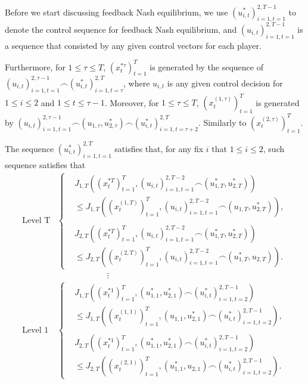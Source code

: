 \documentclass[letterpaper, 10 pt, conference]{ieeeconf}  %
\begin{document}
Before we start discussing feedback Nash equilibrium, we use $(u_{i,t}^{*})_{i=1,t=1}^{2,T-1}$ to denote the control sequence for feedback Nash equilibrium, and $(u_{i,t})_{i=1,t=1}^{2,T-1}$ is a sequence that consisted by any given control vectors for each player. 

Furthermore, for $1 \leq \tau \leq T$, $(x_{t}^{*\tau})_{t=1}^{T}$ is generated by the sequence of $(u_{i,t})_{i=1,t=1}^{2,\tau-1} \frown (u_{i,t}^{*})_{i=1,t=\tau}^{2,T}$, where $u_{i,t}$ is any given control decision for $1 \leq i \leq 2$ and $1 \leq t \leq \tau-1$. Moreover, for $1 \leq \tau \leq T$, $(x_{t}^{(1,\tau)})_{t=1}^{T}$ is generated by $(u_{i,t})_{i=1,t=1}^{2,\tau-1} \frown (u_{1,\tau},u_{2,\tau}^{*}) \frown (u_{i,t}^{*})_{i=1,t=\tau+2}^{2,T}$. Similarly to $(x_{t}^{(2,\tau)})_{t=1}^{T}$.

The sequence $( u_{i,t}^{*})_{i=1,t=1}^{2,T}$ satisfies that, for any fix $i$ that $1 \leq i \leq 2$, such 
sequence satisfies that 
\begin{equation}\label{eq:nashIneq}
    \begin{split}
        \text{Level T}
        &\begin{cases}
            &J_{1,T}((x_{t}^{*T})_{t=1}^{T}, (u_{i,t})_{i=1,t=1}^{2,T-2} \frown (u_{1,T}^{*},u_{2,T}^{*})) \\ & \leq J_{1,T}((x_{t}^{(1,T)})_{t=1}^{T}, (u_{i,t})_{i=1,t=1}^{2,T-2} \frown (u_{1,T},u_{2,T}^{*})),\\ \\
            &J_{2,T}((x_{t}^{*T})_{t=1}^{T}, (u_{i,t})_{i=1,t=1}^{2,T-2} \frown (u_{1,T}^{*},u_{2,T}^{*})) \\ & \leq J_{2,T}((x_{t}^{(2,T)})_{t=1}^{T}, (u_{i,t})_{i=1,t=1}^{2,T-2} \frown (u_{1,T}^{*},u_{2,T})).
        \end{cases}
    \\ &\qquad \qquad \qquad \vdots \\
    \text{Level 1}
        &\begin{cases}
            &J_{1,T}((x_{t}^{*1})_{t=1}^{T}, (u_{1,1}^{*},u_{2,1}^{*}) \frown (u_{i,t}^{*})_{i=1,t=2}^{2,T-1}) \\ & \leq J_{1,T}((x_{t}^{(1,1)})_{t=1}^{T}, (u_{1,1},u_{2,1}^{*}) \frown (u_{i,t}^{*})_{i=1,t=2}^{2,T-1}),\\ \\
            &J_{2,T}((x_{t}^{*1})_{t=1}^{T}, (u_{1,1}^{*},u_{2,1}^{*}) \frown (u_{i,t}^{*})_{i=1,t=2}^{2,T-1}) \\ & \leq J_{2,T}((x_{t}^{(2,1)})_{t=1}^{T}, (u_{1,1}^{*},u_{2,1}) \frown (u_{i,t}^{*})_{i=1,t=2}^{2,T-1}).
        \end{cases}
    \end{split}
\end{equation}
\end{document}
